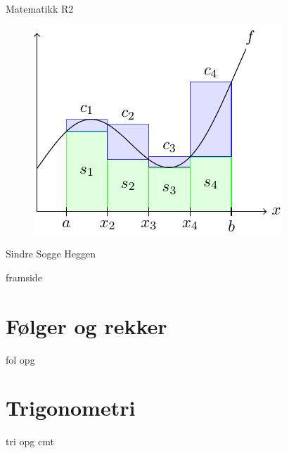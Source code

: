 \documentclass[english,hidelinks,pdftex, 11 pt, class=report,crop=false]{standalone}
\begin{document}
\pagecolor{blue!20}

\begin{titlepage}
	\begin{center}
		\vspace*{1cm}
		
		{}
		
		\vspace{2.45cm} 
		\Large  Matematikk R2
		\begin{figure}[H]
			\centering
			\qquad\includegraphics[scale=1.8]{asymptote/frpg}
		\end{figure}           
		\vspace{2 cm}
		\raggedleft Sindre Sogge Heggen   \end{center}
\end{titlepage}
\pagecolor{white}	

	{framside}
	\newpage

	\footnotesize
	\tableofcontents
	\normalsize
	\chapter{Følger og rekker\label{Folgerogrekker}}
	\vspace{20pt}
	{fol}
	\newpage
	{opg}
	\chapter{Trigonometri\label{Trigonometri}}
	\vspace{20pt}
	{tri}
	\newpage
	{opg}
	\newpage
	{cmt}
\end{document}
